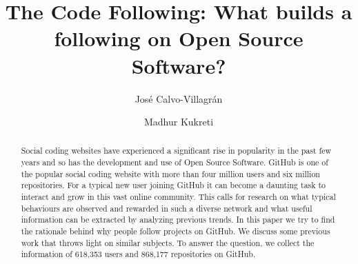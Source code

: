 \documentclass{acm_proc_article-sp}
\begin{document}
\title{The Code Following: What builds a following on Open Source Software?}
\author{
\alignauthor
Jos{\'e} Calvo-Villagr{\'a}n
\and
\alignauthor
Madhur Kukreti
}

\maketitle

\begin{abstract}
Social coding websites have experienced a significant rise in popularity in the past few years and so has the development and use of Open Source Software. GitHub is one of the popular social coding website with more than four million users and six million repositories. For a typical new user joining GitHub it can become a daunting task to interact and grow in this vast online community. This calls for research on what typical behaviours are observed and rewarded in such a diverse network and what useful information can be extracted by analyzing previous trends.  In this paper we try to find the rationale behind why people follow projects on GitHub. We discuss some previous work that throws light on similar subjects. To answer the question, we collect the information of 618,353 users and 868,177 repositories on GitHub. 
\end{abstract}













\end{document}
